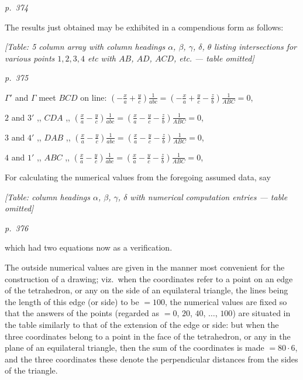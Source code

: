 \documentclass[11pt,a4paper]{article}
\theoremstyle{plain}
\theoremstyle{definition}
\begin{document}
\clearpage

\bigskip
\textit{p.~374}
\smallskip

The results just obtained may be exhibited in a compendious form as follows:
\begin{center}
\textit{[Table: 5 column array with column headings $\alpha$, $\beta$, $\gamma$, $\delta$, $\theta$}
\textit{listing intersections for various points $1, 2, 3, 4$ etc with $AB$, $AD$, $ACD$, etc.}
\textit{--- table omitted]}
\end{center}

\clearpage

\bigskip
\textit{p.~375}
\smallskip

\noindent
$\Gamma'$ and $\Gamma$ meet $BCD$ on line: $\left(-\frac{x}{a} + \frac{y}{c}\right)\frac{1}{abc} = \left(-\frac{x}{a} + \frac{y}{c} - \frac{z}{b}\right)\frac{1}{ABC} = 0$,

$2$ and $3'$ ,, $CDA$ ,, $\left(\frac{x}{a} - \frac{y}{c}\right)\frac{1}{abc} = \left(\frac{x}{a} - \frac{y}{c} - \frac{z}{b}\right)\frac{1}{ABC} = 0$,

$3$ and $4'$ ,, $DAB$ ,, $\left(\frac{x}{a} - \frac{y}{c}\right)\frac{1}{abc} = \left(\frac{x}{a} - \frac{y}{c} - \frac{z}{b}\right)\frac{1}{ABC} = 0$,

$4$ and $1'$ ,, $ABC$ ,, $\left(\frac{x}{a} - \frac{y}{c}\right)\frac{1}{abc} = \left(\frac{x}{a} - \frac{y}{c} - \frac{z}{b}\right)\frac{1}{ABC} = 0$,

For calculating the numerical values from the foregoing assumed data, say
\begin{center}
\textit{[Table: column headings $\alpha$, $\beta$, $\gamma$, $\delta$ with numerical}
\textit{computation entries --- table omitted]}
\end{center}

\clearpage

\bigskip
\textit{p.~376}
\smallskip

\noindent
which had two equations now as a verification.

The outside numerical values are given in the manner most convenient for the
construction of a drawing; viz.\ when the coordinates refer to a point on an edge of
the tetrahedron, or any on the side of an equilateral triangle, the lines being the length of
this edge (or side) to be $= 100$, the numerical values are fixed so that the answers of
the points (regarded as $= 0$, $20$, $40$, $\ldots$, $100$) are situated in the table similarly to that of
the extension of the edge or side: but when the three coordinates belong to a point
in the face of the tetrahedron, or any in the plane of an equilateral triangle, then the sum of the coordinates is made $= 80\cdot 6$, and the three coordinates these denote the
perpendicular distances from the sides of the triangle.
\end{document}
